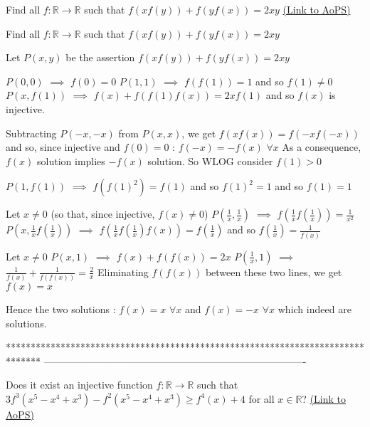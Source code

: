 \begin{problem}
	Find all $f:\mathbb{R}\rightarrow \mathbb{R}$ such that $f(xf(y))+f(yf(x))=2xy$
	\flushright \href{https://artofproblemsolving.com/community/c6h566131}{(Link to AoPS)}
\end{problem}



\begin{solution}
	\begin{tcolorbox}Find all $f:\mathbb{R}\rightarrow \mathbb{R}$ such that $f(xf(y))+f(yf(x))=2xy$\end{tcolorbox}
Let $P(x,y)$ be the assertion $f(xf(y))+f(yf(x))=2xy$

$P(0,0)$ $\implies$ $f(0)=0$
$P(1,1)$ $\implies$ $f(f(1))=1$ and so $f(1)\ne 0$
$P(x,f(1))$ $\implies$ $f(x)+f(f(1)f(x))=2xf(1)$ and so $f(x)$ is injective.

Subtracting $P(-x,-x)$ from $P(x,x)$, we get $f(xf(x))=f(-xf(-x))$ and so, since injective and $f(0)=0$ : $f(-x)=-f(x)$ $\forall x$
As a consequence, $f(x)$ solution implies $-f(x)$ solution. So WLOG consider $f(1)>0$

$P(1,f(1))$ $\implies$ $f(f(1)^2)=f(1)$ and so $f(1)^2=1$ and so $f(1)=1$

Let $x\ne 0$ (so that, since injective, $f(x)\ne 0$)
$P(\frac 1x,\frac 1x)$ $\implies$ $f(\frac 1xf(\frac 1x))=\frac 1{x^2}$
$P(x,\frac 1xf(\frac 1x))$ $\implies$ $f(\frac 1xf(\frac 1x)f(x))=f(\frac 1x)$ and so $f(\frac 1x)=\frac 1{f(x)}$

Let $x\ne 0$
$P(x,1)$ $\implies$ $f(x)+f(f(x))=2x$
$P(\frac 1x,1)$ $\implies$ $\frac 1{f(x)}+\frac 1{f(f(x))}=\frac 2x$
Eliminating $f(f(x))$ between these two lines, we get $f(x)=x$

Hence the two solutions : $\boxed{f(x)=x}$ $\forall x$ and $\boxed{f(x)=-x}$ $\forall x$ which indeed are solutions.
\end{solution}
*******************************************************************************
-------------------------------------------------------------------------------

\begin{problem}
	Does it exist an injective function $f: \mathbb{R}\to\mathbb{R}$ such that $3f^3(x^5-x^4+x^3) - f^2(x^5-x^4+x^3) \ge f^4(x)+4$ for all $x \in \mathbb{R}$?
	\flushright \href{https://artofproblemsolving.com/community/c6h566289}{(Link to AoPS)}
\end{problem}




